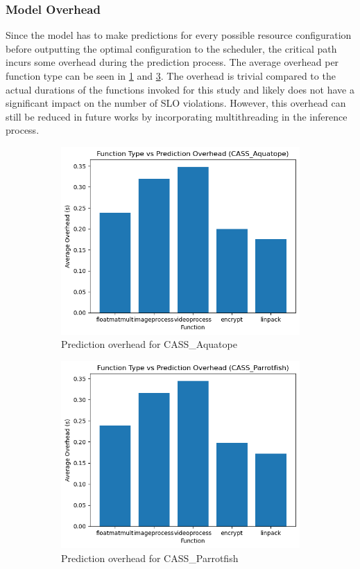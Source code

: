 \documentclass[times, 10pt,twocolumn]{article}
\begin{document}
\subsubsection{Model Overhead}

Since the model has to make predictions for every possible resource configuration before outputting the optimal configuration to the scheduler, the critical path incurs some overhead during the prediction process. The average overhead per function type can be seen in \ref{fig:cass_aquatope_overhead} and \ref{fig:cass_parrotfish_overhead}. The overhead is trivial compared to the actual durations of the functions invoked for this study and likely does not have a significant impact on the number of SLO violations. However, this overhead can still be reduced in future works by incorporating multithreading in the inference process. 

\begin{figure}[H] %
   \centering
   \begin{subfigure}[b]{0.5\textwidth} %
         \centering
         \includegraphics[width=0.6\linewidth]{imgs/final_experiment_plots/model_analysis/prediction_overhead/cass_aquatope.png}
         \caption{Prediction overhead for CASS\_Aquatope}
         \label{fig:cass_aquatope_overhead}
   \end{subfigure}
   \begin{subfigure}[b]{0.5\textwidth} %
         \centering
         \includegraphics[width=0.6\linewidth]{imgs/final_experiment_plots/model_analysis/prediction_overhead/cass_parrotfish.png}
         \caption{Prediction overhead for CASS\_Parrotfish}
         \label{fig:cass_parrotfish_overhead}
   \end{subfigure}
   \caption{}
\end{figure}
\end{document}

